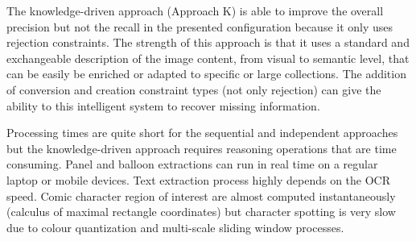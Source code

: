 The knowledge-driven approach (Approach K) is able to improve the overall precision but not the recall in the presented configuration because it only uses rejection constraints.
The strength of this approach is that it uses a standard and exchangeable description of the image content, from visual to semantic level, that can be easily be enriched or adapted to specific or large collections.
The addition of conversion and creation constraint types (not only rejection) can give the ability to this intelligent system to recover missing information.

Processing times are quite short for the sequential and independent approaches but the knowledge-driven approach requires reasoning operations that are time consuming.
Panel and balloon extractions can run in real time on a regular laptop or mobile devices.
Text extraction process highly depends on the OCR speed.
Comic character region of interest are almost computed instantaneously (calculus of maximal rectangle coordinates) but character spotting is very slow due to colour quantization and multi-scale sliding window processes.


